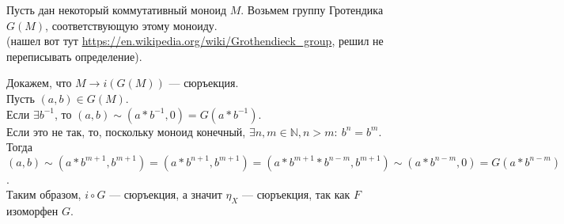 \documentclass[draft]{article}
\begin{document}
\begin{enumerate}
\begin{enumerate}
Пусть дан некоторый коммутативный моноид $M$. Возьмем группу Гротендика $G(M)$, соответствующую этому моноиду.\\
(нашел вот тут \url{https://en.wikipedia.org/wiki/Grothendieck_group}, решил не переписывать определение).

Докажем, что $M \to i(G(M))$ --- сюръекция.\\
Пусть $(a, b) \in G(M)$. \\
Если $\exists b^{-1}$, то $(a, b) \sim (a*b^{-1}, 0) = G(a*b^{-1})$.\\
Если это не так, то, поскольку моноид конечный, $\exists n,m \in \mathbb{N}, n > m: ~b^n=b^m$. Тогда $(a, b) \sim (a*b^{m+1}, b^{m+1}) = (a*b^{n+1}, b^{m+1}) = (a*b^{m+1}*b^{n - m}, b^{m+1}) \sim (a*b^{n - m}, 0) = G(a*b^{n - m})$.\\

Таким образом, $i \circ G$ --- сюръекция, а значит $\eta_X$ --- сюръекция, так как $F$ изоморфен $G$.
\end{enumerate}

\end{enumerate}
\end{document}
